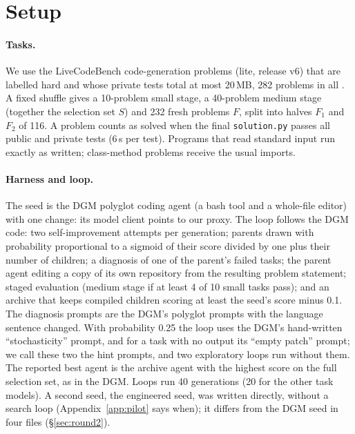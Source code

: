 \section{Setup}\label{sec:setup}
\paragraph{Tasks.} We use the LiveCodeBench code-generation problems (lite, release v6) that are labelled hard and
whose private tests total at most 20\,MB, 282 problems in all \citep{jain2025livecodebench}. A fixed shuffle gives a
10-problem small stage, a 40-problem medium stage (together the selection set $S$) and 232 fresh problems $F$, split
into halves $F_1$ and $F_2$ of 116. A problem counts as solved when the final \texttt{solution.py} passes all public
and private tests (6\,s per test). Programs that read standard input run exactly as written; class-method problems
receive the usual imports.

\paragraph{Harness and loop.} The seed is the DGM polyglot coding agent (a bash tool and a whole-file editor) with one
change: its model client points to our proxy. The loop follows the DGM code: two self-improvement attempts per
generation; parents drawn with probability proportional to a sigmoid of their score divided by one plus their number
of children; a diagnosis of one of the parent's failed tasks; the parent agent editing a copy of its own repository
from the resulting problem statement; staged evaluation (medium stage if at least 4 of 10 small tasks pass); and an
archive that keeps compiled children scoring at least the seed's score minus 0.1. The diagnosis prompts are the DGM's
polyglot prompts with the language sentence changed. With probability 0.25 the loop uses the DGM's hand-written
``stochasticity'' prompt, and for a task with no output its ``empty patch'' prompt; we call these two the hint prompts,
and two exploratory loops run without them. The reported best agent is the
archive agent with the highest score on the full selection set, as in the DGM. Loops run 40 generations (20 for the
other task models). A second seed, the engineered seed, was written directly, without a search loop (Appendix~\ref{app:pilot}
says when); it differs from the DGM seed in four files (\S\ref{sec:round2}).


